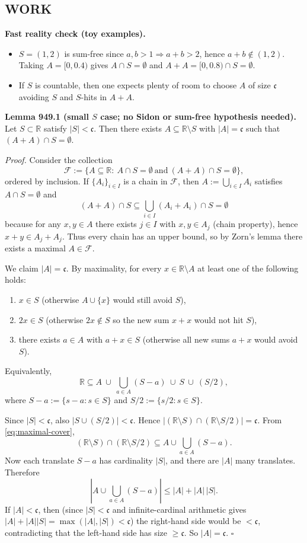 \subsection*{WORK}
\noindent\textbf{Fast reality check (toy examples).}
\begin{itemize}
\item $S=(1,2)$ is sum-free since $a,b>1\Rightarrow a+b>2$, hence $a+b\notin(1,2)$. Taking $A=[0,0.4)$ gives $A\cap S=\emptyset$ and $A+A=[0,0.8)\cap S=\emptyset$.
\item If $S$ is countable, then one expects plenty of room to choose $A$ of size $\mathfrak c$ avoiding $S$ and $S$-hits in $A+A$.
\end{itemize}

\medskip
\noindent\textbf{Lemma 949.1 (small $S$ case; no Sidon or sum-free hypothesis needed).}
Let $S\subset\mathbb R$ satisfy $|S|<\mathfrak c$. Then there exists $A\subseteq\mathbb R\setminus S$ with $|A|=\mathfrak c$ such that $(A+A)\cap S=\emptyset$.

\medskip
\noindent\emph{Proof.}
Consider the collection
\[
\mathcal F:=\{A\subseteq\mathbb R:\ A\cap S=\emptyset\ \text{and}\ (A+A)\cap S=\emptyset\},
\]
ordered by inclusion.
If $\{A_i\}_{i\in I}$ is a chain in $\mathcal F$, then $A:=\bigcup_{i\in I}A_i$ satisfies $A\cap S=\emptyset$ and
\[
(A+A)\cap S\subseteq \bigcup_{i\in I}(A_i+A_i)\cap S=\emptyset
\]
because for any $x,y\in A$ there exists $j\in I$ with $x,y\in A_j$ (chain property), hence $x+y\in A_j+A_j$.
Thus every chain has an upper bound, so by Zorn's lemma there exists a maximal $A\in\mathcal F$.

We claim $|A|=\mathfrak c$.
By maximality, for every $x\in\mathbb R\setminus A$ at least one of the following holds:
\begin{enumerate}
\item $x\in S$ (otherwise $A\cup\{x\}$ would still avoid $S$),
\item $2x\in S$ (otherwise $2x\notin S$ so the new sum $x+x$ would not hit $S$),
\item there exists $a\in A$ with $a+x\in S$ (otherwise all new sums $a+x$ would avoid $S$).
\end{enumerate}
Equivalently,
\begin{equation}\label{eq:maximal-cover}
\mathbb R\subseteq A\ \cup\ \bigcup_{a\in A}(S-a)\ \cup\ S\ \cup\ (S/2),
\end{equation}
where $S-a:=\{s-a:s\in S\}$ and $S/2:=\{s/2:s\in S\}$.

Since $|S|<\mathfrak c$, also $|S\cup (S/2)|<\mathfrak c$.
Hence $|(\mathbb R\setminus S)\cap (\mathbb R\setminus S/2)|=\mathfrak c$.
From \eqref{eq:maximal-cover},
\[
(\mathbb R\setminus S)\cap (\mathbb R\setminus S/2)\subseteq A\cup \bigcup_{a\in A}(S-a).
\]
Now each translate $S-a$ has cardinality $|S|$, and there are $|A|$ many translates. Therefore
\[
\left|A\cup \bigcup_{a\in A}(S-a)\right|\le |A|+|A|\,|S|.
\]
If $|A|<\mathfrak c$, then (since $|S|<\mathfrak c$ and infinite-cardinal arithmetic gives $|A|+|A||S|=\max(|A|,|S|)<\mathfrak c$) the right-hand side would be $<\mathfrak c$, contradicting that the left-hand side has size $\ge \mathfrak c$.
So $|A|=\mathfrak c$.
\hfill $\square$

